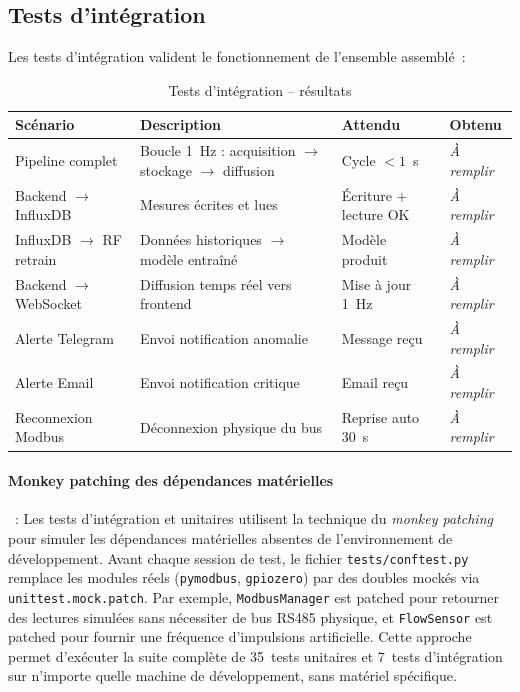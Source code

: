 \subsection{Tests d'intégration}

Les tests d'intégration valident le fonctionnement de l'ensemble assemblé~:

\begin{table}[htbp]
\centering
\caption{Tests d'intégration -- résultats}
\label{tab:tests_integration}
\begin{tabular}{p{}p{}p{}p{}}
\toprule
\textbf{Scénario} & \textbf{Description} & \textbf{Attendu} & \textbf{Obtenu} \\
\midrule
Pipeline complet & Boucle 1~Hz : acquisition $\rightarrow$ stockage $\rightarrow$ diffusion & Cycle $<1$~s & \textit{À remplir} \\
Backend $\rightarrow$ InfluxDB & Mesures écrites et lues & Écriture + lecture OK & \textit{À remplir} \\
InfluxDB $\rightarrow$ RF retrain & Données historiques $\rightarrow$ modèle entraîné & Modèle produit & \textit{À remplir} \\
Backend $\rightarrow$ WebSocket & Diffusion temps réel vers frontend & Mise à jour 1~Hz & \textit{À remplir} \\
Alerte Telegram & Envoi notification anomalie & Message reçu & \textit{À remplir} \\
Alerte Email & Envoi notification critique & Email reçu & \textit{À remplir} \\
Reconnexion Modbus & Déconnexion physique du bus & Reprise auto 30~s & \textit{À remplir} \\
\bottomrule
\end{tabular}
\end{table}

\paragraph{Monkey patching des dépendances matérielles}~: Les tests d'intégration et unitaires utilisent la technique du \textit{monkey patching} pour simuler les dépendances matérielles absentes de l'environnement de développement. Avant chaque session de test, le fichier \texttt{tests/conftest.py} remplace les modules réels (\texttt{pymodbus}, \texttt{gpiozero}) par des doubles mockés via \texttt{unittest.mock.patch}. Par exemple, \texttt{ModbusManager} est patched pour retourner des lectures simulées sans nécessiter de bus RS485 physique, et \texttt{FlowSensor} est patched pour fournir une fréquence d'impulsions artificielle. Cette approche permet d'exécuter la suite complète de 35~tests unitaires et 7~tests d'intégration sur n'importe quelle machine de développement, sans matériel spécifique.

